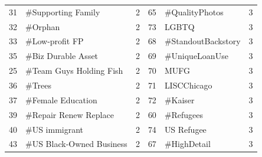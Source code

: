 \begin{longtable}{|r|l|l|r|l|l|}
	31                                & \#Supporting Family                & 2                                                  & 65                               & \#QualityPhotos                     & 3                                          \\
	32                                & \#Orphan                           & 2                                                  & 73                               & LGBTQ                               & 3                                          \\
	33                                & \#Low-profit FP                    & 2                                                  & 68                               & \#StandoutBackstory                 & 3                                          \\
	35                                & \#Biz Durable Asset                & 2                                                  & 69                               & \#UniqueLoanUse                     & 3                                          \\
	25                                & \#Team Guys Holding Fish           & 2                                                  & 70                               & MUFG                                & 3                                          \\
	36                                & \#Trees                            & 2                                                  & 71                               & LISCChicago                         & 3                                          \\
	37                                & \#Female Education                 & 2                                                  & 72                               & \#Kaiser                            & 3                                          \\
	39                                & \#Repair Renew Replace             & 2                                                  & 60                               & \#Refugees                          & 3                                          \\
	40                                & \#US immigrant                     & 2                                                  & 74                               & US Refugee                          & 3                                          \\
	43                                & \#US Black-Owned Business          & 2                                                  & 67                               & \#HighDetail                        & 3                                          \\

\end{longtable}
